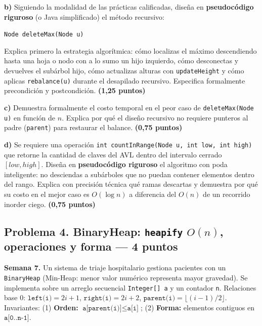 \documentclass[10pt,a4paper]{article}
\newcommand{\pts}[1]{\textbf{(#1)}}
\begin{document}
\textbf{b)} Siguiendo la modalidad de las prácticas calificadas, diseña en \textbf{pseudocódigo riguroso} (o Java simplificado) el método recursivo:
\begin{center}
\texttt{Node deleteMax(Node u)}
\end{center}
Explica primero la estrategia algorítmica: cómo localizas el máximo descendiendo hasta una hoja o nodo con a lo sumo un hijo izquierdo, cómo desconectas y devuelves el subárbol hijo, cómo actualizas alturas con \texttt{updateHeight} y cómo aplicas \texttt{rebalance(u)} durante el desapilado recursivo. Especifica formalmente precondición y postcondición. \pts{1,25 puntos}

\textbf{c)} Demuestra formalmente el costo temporal en el peor caso de \texttt{deleteMax(Node u)} en función de $n$. Explica por qué el diseño recursivo no requiere punteros al padre (\texttt{parent}) para restaurar el balance. \pts{0,75 puntos}

\textbf{d)} Se requiere una operación \texttt{int countInRange(Node u, int low, int high)} que retorne la cantidad de claves del AVL dentro del intervalo cerrado $[low, high]$. Diseña en \textbf{pseudocódigo riguroso} el algoritmo con poda inteligente: no desciendas a subárboles que no puedan contener elementos dentro del rango. Explica con precisión técnica qué ramas descartas y demuestra por qué su costo en el mejor caso es $O(\log n)$ a diferencia del $O(n)$ de un recorrido inorder ciego. \pts{0,75 puntos}

\newpage
\subsection*{Problema 4. BinaryHeap: \texttt{heapify} $O(n)$, operaciones y forma --- 4 puntos}

\footnotesize
\textbf{Semana 7.} Un sistema de triaje hospitalario gestiona pacientes con un \texttt{BinaryHeap} (Min-Heap: menor valor numérico representa mayor gravedad). Se implementa sobre un arreglo secuencial \texttt{Integer[] a} y un contador \texttt{n}. Relaciones base 0: $\texttt{left(i)} = 2i + 1$, $\texttt{right(i)} = 2i + 2$, $\texttt{parent(i)} = \lfloor (i - 1)/2 \rfloor$.
Invariantes: (1) \textbf{Orden:} $\texttt{a[parent(i)]} \le \texttt{a[i]}$; (2) \textbf{Forma:} elementos contiguos en $\texttt{a[0..n-1]}$.
\end{document}
